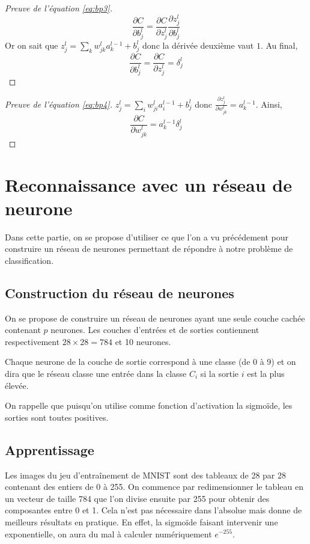 \begin{proof}[Preuve de l'équation \ref{eq:bp3}]
\[
\frac{\partial C}{\partial b_{j}^{l}} = \frac{\partial C}{\partial z_{j}^{l}} \frac{\partial z_{j}^{l}}{\partial b_{j}^{l}}
\]
Or on sait que $z_{j}^{l} = \sum_{k} w_{jk}^{l} a_{k}^{l-1} + b_{j}^{l}$ donc la dérivée deuxième vaut $1$.
Au final,
\[
\frac{\partial C}{\partial b_{j}^{l}} = \frac{\partial C}{\partial z_{j}^{l}} = \delta_{j}^{l}
\]
\end{proof}

\begin{proof}[Preuve de l'équation \ref{eq:bp4}]
$z_{j}^{l} = \sum_{i} w_{ji}^{l} a_{i}^{l-1} + b_{j}^{l}$ donc $\frac{\partial z_{j}^{l}}{\partial w_{jk}^{l}} = a_{k}^{l-1}$.
Ainsi, 
\[
\frac{\partial C}{\partial w_{jk}^{l}} = a_{k}^{l-1} \delta_{j}^{l}
\]
\end{proof}



\section{Reconnaissance avec un réseau de neurone}

Dans cette partie, on se propose d'utiliser ce que l'on a vu 
précédement pour construire un réseau de neurones permettant 
de répondre à notre problème de classification.


\subsection{Construction du réseau de neurones}

On se propose de construire un réseau de neurones ayant une 
seule couche cachée contenant $p$ neurones. 
Les couches d'entrées et de sorties contiennent respectivement 
$28 \times 28 = 784$ et 10 neurones.

Chaque neurone de la couche de sortie correspond à une classe 
(de 0 à 9) et on dira que le réseau classe une entrée dans la 
classe $C_i$ si la sortie $i$ est la plus élevée.

On rappelle que puisqu'on utilise comme fonction d'activation 
la sigmoïde, les sorties sont toutes positives.


\subsection{Apprentissage}

Les images du jeu d'entraînement de \textsc{MNIST} sont des 
tableaux de 28 par 28 contenant des entiers de 0 à 255.
On commence par redimensionner le tableau en un vecteur 
de taille 784 que l'on divise ensuite par 255 pour obtenir 
des composantes entre 0 et 1. 
Cela n'est pas nécessaire dans l'absolue mais donne de 
meilleurs résultats en pratique.
En effet, la sigmoïde faisant intervenir une exponentielle, 
on aura du mal à calculer numériquement $e^{-255}$.


